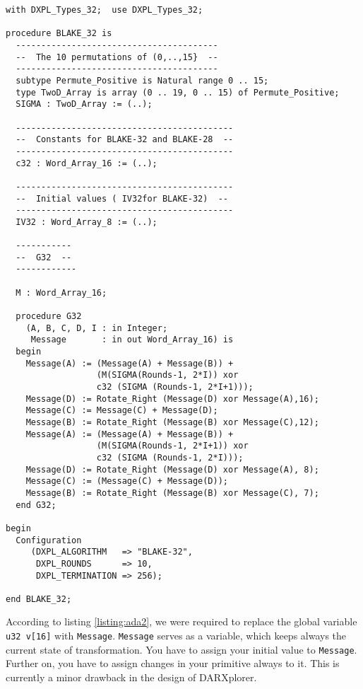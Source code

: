 \documentclass{acmtrans2m}
\begin{document}
\begin{lstlisting}[caption={Incorporating G32 to Ada, whereby the permutation, the
constants and the initial values are omitted for readability},label=listing:ada2]
with DXPL_Types_32;  use DXPL_Types_32;

procedure BLAKE_32 is
  ----------------------------------------
  --  The 10 permutations of (0,..,15}  --
  ----------------------------------------
  subtype Permute_Positive is Natural range 0 .. 15;
  type TwoD_Array is array (0 .. 19, 0 .. 15) of Permute_Positive;
  SIGMA : TwoD_Array := (..);

  -------------------------------------------
  --  Constants for BLAKE-32 and BLAKE-28  --
  -------------------------------------------
  c32 : Word_Array_16 := (..); 

  -------------------------------------------
  --  Initial values ( IV32for BLAKE-32)  --
  -------------------------------------------
  IV32 : Word_Array_8 := (..);
  
  -----------
  --  G32  --
  ------------

  M : Word_Array_16;

  procedure G32
    (A, B, C, D, I : in Integer;
     Message       : in out Word_Array_16) is
  begin
    Message(A) := (Message(A) + Message(B)) + 
                  (M(SIGMA(Rounds-1, 2*I)) xor
                  c32 (SIGMA (Rounds-1, 2*I+1)));
    Message(D) := Rotate_Right (Message(D) xor Message(A),16);
    Message(C) := Message(C) + Message(D);
    Message(B) := Rotate_Right (Message(B) xor Message(C),12);
    Message(A) := (Message(A) + Message(B)) +
                  (M(SIGMA(Rounds-1, 2*I+1)) xor
                  c32 (SIGMA (Rounds-1, 2*I)));
    Message(D) := Rotate_Right (Message(D) xor Message(A), 8);
    Message(C) := (Message(C) + Message(D));
    Message(B) := Rotate_Right (Message(B) xor Message(C), 7);
  end G32;
     
begin
  Configuration
     (DXPL_ALGORITHM   => "BLAKE-32",
      DXPL_ROUNDS      => 10,
      DXPL_TERMINATION => 256);

end BLAKE_32;
\end{lstlisting}

According to listing \ref{listing:ada2}, we were required to replace the global
variable \texttt{u32 v[16]} with \texttt{Message}. \texttt{Message} serves as
a variable, which keeps always the current state of transformation. You have
to assign your initial value to \texttt{Message}. Further on, you have to assign 
changes in your primitive always to it. This is currently a minor drawback in
the design of DARXplorer.
\end{document}
